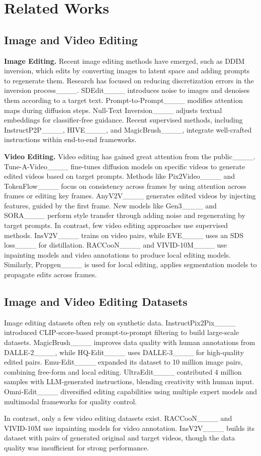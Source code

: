 \section{Related Works}
\subsection{Image and Video Editing}

\textbf{Image Editing.}
Recent image editing methods have emerged, such as DDIM inversion, which edits by converting images to latent space and adding prompts to regenerate them. Research has focused on reducing discretization errors in the inversion process____. SDEdit____ introduces noise to images and denoises them according to a target text. Prompt-to-Prompt____ modifies attention maps during diffusion steps. Null-Text Inversion____ adjusts textual embeddings for classifier-free guidance. Recent supervised methods, including InstructP2P____, HIVE____, and MagicBrush____, integrate well-crafted instructions within end-to-end frameworks.

\textbf{Video Editing.}
Video editing has gained great attention from the public____. Tune-A-Video____ fine-tunes diffusion models on specific videos to generate edited videos based on target prompts. Methods like Pix2Video____ and TokenFlow____ focus on consistency across frames by using attention across frames or editing key frames. AnyV2V____ generates edited videos by injecting features, guided by the first frame. New models like Gen3____ and SORA____ perform style transfer through adding noise and regenerating by target prompts. In contrast, few video editing approaches use supervised methods. InsV2V____ trains on video pairs, while EVE____ uses an SDS loss____ for distillation. RACCooN____ and VIVID-10M____ use inpainting models and video annotations to produce local editing models. Similarly, Propgen____ is used for local editing, applies segmentation models to propagate edits across frames.

\subsection{Image and Video Editing Datasets}
Image editing datasets often rely on synthetic data. InstructPix2Pix____ introduced CLIP-score-based prompt-to-prompt filtering to build large-scale datasets. MagicBrush____ improves data quality with human annotations from DALLE-2____, while HQ-Edit____ uses DALLE-3____ for high-quality edited pairs. Emu-Edit____ expanded its dataset to 10 million image pairs, combining free-form and local editing. UltraEdit____ contributed 4 million samples with LLM-generated instructions, blending creativity with human input. Omni-Edit____ diversified editing capabilities using multiple expert models and multimodal frameworks for quality control.

In contrast, only a few video editing datasets exist. RACCooN____ and VIVID-10M use inpainting models for video annotation. InsV2V____ builds its dataset with pairs of generated original and target videos, though the data quality was insufficient for strong performance.